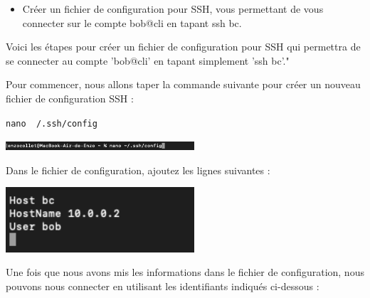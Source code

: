 \documentclass[12pt]{article}
\begin{document}
\begin{itemize}
  \item Créer un fichier de configuration pour SSH, vous permettant de vous connecter sur le compte bob@cli en tapant ssh bc.
\end{itemize}

\vspace{0.3cm}

Voici les étapes pour créer un fichier de configuration pour SSH qui permettra de se connecter au compte 'bob@cli' en tapant simplement 'ssh bc'."

\vspace{0.3cm}

Pour commencer, nous allons taper la commande suivante pour créer un nouveau fichier de configuration SSH :

\texttt{nano ~/.ssh/config}

\vspace{0.3cm}

\begin{center}
  \includegraphics[width=7cm]{Images-Client-SSH/Image-TD-SSH-3/fichier-config.png}
\end{center}

\vspace{0.3cm}

Dans le fichier de configuration, ajoutez les lignes suivantes :

\vspace{0.3cm}

\begin{center}
  \includegraphics[width=7cm]{Images-Client-SSH/Image-TD-SSH-3/ligne-conf.png}
\end{center}

\vspace{0.3cm}

\newpage

Une fois que nous avons mis les informations dans le fichier de configuration, nous pouvons nous connecter en utilisant les identifiants indiqués ci-dessous :

\vspace{0.3cm}
\end{document}
